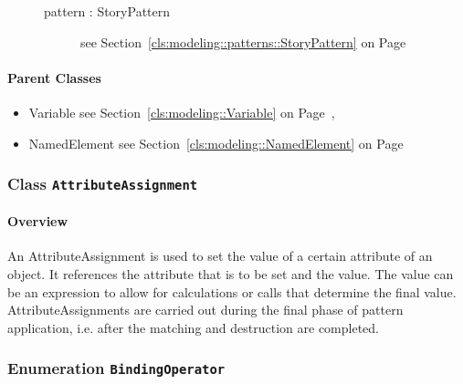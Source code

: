 \begin{description}
\begin{description}
	
\item[pattern : StoryPattern 	]
see Section~\ref{cls:modeling::patterns::StoryPattern} on Page~\pageref{cls:modeling::patterns::StoryPattern}\hspace{\fill}
\nopagebreak


	
	\end{description}
	

\end{description}

\paragraph{Parent Classes}
\begin{itemize}
\item Variable see Section~\ref{cls:modeling::Variable} on Page~\pageref{cls:modeling::Variable}, \item NamedElement see Section~\ref{cls:modeling::NamedElement} on Page~\pageref{cls:modeling::NamedElement}\end{itemize}
\subsubsection{\Large{Class \bfseries \texttt{AttributeAssignment}\normalfont}}
\label{cls:modeling::patterns::AttributeAssignment} 
\paragraph{Overview}

	
			
An AttributeAssignment is used to set the value of a certain attribute of an object. It references the attribute that is to be set and the value. The value can be an expression to allow for calculations or calls that determine the final value. AttributeAssignments are carried out during the final phase of pattern application, i.e. after the matching and destruction are completed.	
		
	



\subsubsection{\Large{Enumeration \bfseries \texttt{BindingOperator}\normalfont}}
\label{cls:modeling::patterns::BindingOperator} 
